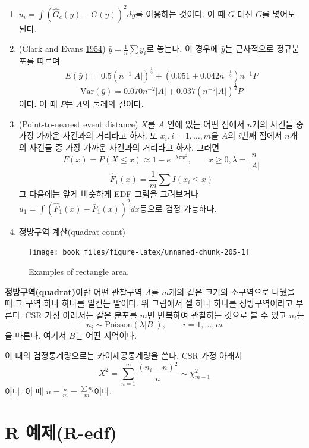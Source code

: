 \documentclass[b5paper,]{book}
\theoremstyle{definition}
\theoremstyle{definition}
\theoremstyle{definition}
\theoremstyle{remark}
\begin{document}
\begin{enumerate}
\def\labelenumi{\arabic{enumi}.}
\item
  \(u_{i}=\int (\hat{G}_{c}(y)-G(y))^{2}dy\)를 이용하는 것이다. 이 때
  \(G\) 대신 \(\bar{G}\)를 넣어도 된다.
\item
  (Clark and Evans \protect\hyperlink{ref-Clark1954}{1954})
  \(\bar{y}=\frac{1}{n}\sum y_{i}\)로 놓는다. 이 경우에 \(\bar{y}\)는
  근사적으로 정규분포를 따르며
  \[E(\bar{y})=0.5(n^{-1}|A|)^{\frac{1}{2}} + (0.051 + 0.042 n^{-\frac{1}{2}})n^{-1}P\]
  \[\text{Var}(\bar{y})=0.070n^{-2}|A| + 0.037(n^{-5}|A|)^{\frac{1}{2}}P\]
  이다. 이 때 \(P\)는 \(A\)의 둘레의 길이다.
\item
  (Point-to-nearest event distance) \(X\)를 \(A\) 안에 있는 어떤 점에서
  \(n\)개의 사건들 중 가장 가까운 사건과의 거리라고 하자. 또
  \(x_{i}, i=1,\ldots ,m\)을 \(A\)의 \(i\)번째 점에서 \(n\)개의 사건들
  중 가장 가까운 사건과의 거리라고 하자. 그러면
  \[F(x)=P(X\leq x) \approx 1 - e^{-\lambda \pi x^{2}}, \qquad{x \geq 0, \lambda = \frac{n}{|A|}}\]
  \[\hat{F}_{1}(x)=\frac{1}{m}\sum I(x_{i}\leq x)\] 그 다음에는 앞게
  비슷하게 EDF 그림을 그려보거나
  \(u_{1}=\int (\hat{F}_{1}(x)-\bar{F}_{1}(x))^{2}dx\)등으로 검정
  가능하다.
\item
  정방구역 계산(quadrat count)
\end{enumerate}

\begin{figure}

{\centering \texttt{[image: book\_files/figure-latex/unnamed-chunk-205-1]} 

}

\caption{Examples of rectangle area.}\label{fig:unnamed-chunk-205}
\end{figure}

\textbf{정방구역(quadrat)}이란 어떤 관찰구역 \(A\)를 \(m\)개의 같은
크기의 소구역으로 나눴을 때 그 구역 하나 하나를 일컫는 말이다. 위
그림에서 셀 하나 하나를 정방구역이라고 부른다. CSR 가정 아래서는 같은
분포를 \(m\)번 반복하여 관찰하는 것으로 볼 수 있고 \(n_{i}\)는
\[n_{i} \sim \text{Poisson}(\lambda |B|),\qquad{i=1,\ldots, m}\] 을
따른다. 여기서 \(B\)는 어떤 지역이다.

이 때의 검정통계량으로는 카이제공통계량을 쓴다. CSR 가정 아래서
\[X^{2}=\sum_{n=1}^{m}\frac{(n_{i}-\bar{n})^{2}}{\bar{n}} \sim \chi_{m-1}^{2}\]
이다. 이 때 \(\bar{n}=\frac{n}{m}=\frac{\sum n_{i}}{m}\)이다.

\section{R 예제(R-edf)}\label{r-r-edf}
\end{document}
